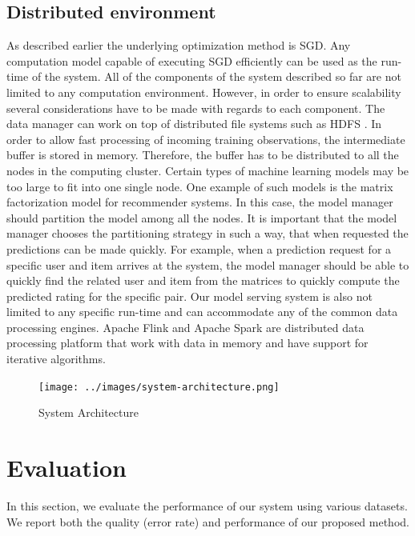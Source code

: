 \documentclass{vldb}
\begin{document}
\subsection{Distributed environment} 
As described earlier the underlying optimization method is SGD.
Any computation model capable of executing SGD efficiently can be used as the run-time of the system.
All of the components of the system described so far are not limited to any computation environment.
However, in order to ensure scalability several considerations have to be made with regards to each component.
The data manager can work on top of distributed file systems such as HDFS \cite{shvachko2010hadoop}. 
In order to allow fast processing of incoming training observations, the intermediate buffer is stored in memory.
Therefore, the buffer has to be distributed to all the nodes in the computing cluster.
Certain types of machine learning models may be too large to fit into one single node.
One example of such models is the matrix factorization model for recommender systems.
In this case, the model manager should partition the model among all the nodes.
It is important that the model manager chooses the partitioning strategy in such a way, that when requested the predictions can be made quickly.
For example, when a prediction request for a specific user and item arrives at the system, the model manager should be able to quickly find the related user and item from the matrices to quickly compute the predicted rating for the specific pair.
Our model serving system is also not limited to any specific run-time and can accommodate any of the common data processing engines.
Apache Flink \cite{carbone2015apache} and Apache Spark \cite{zaharia2010spark} are distributed data processing platform that work with data in memory and have support for iterative algorithms. %

\begin{figure}[t]
\centering
\texttt{[image: ../images/system-architecture.png]}
\caption{System Architecture}
\label{fig:system-architecture}
\end{figure}

\section{Evaluation} \label{evaluation} 
In this section, we evaluate the performance of our system using various datasets. 
We report both the quality (error rate) and performance of our proposed method. 
\end{document}
